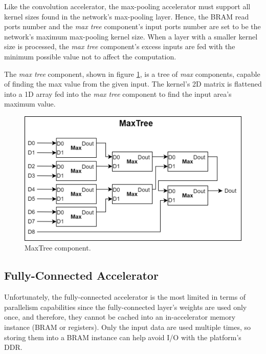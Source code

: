 Like the convolution accelerator, the max-pooling accelerator must support all kernel sizes found in the network's max-pooling layer. Hence, the BRAM read ports number and the \emph{max tree} component's input ports number are set to be the network's maximum max-pooling kernel size. When a layer with a smaller kernel size is processed, the \emph{max tree} component's excess inputs are fed with the minimum possible value not to affect the computation.

The \emph{max tree} component, shown in figure \ref{fig:max-tree-component}, is a tree of \emph{max} components, capable of finding the max value from the given input. The kernel's 2D matrix is flattened into a 1D array fed into the \emph{max tree} component to find the input area's maximum value.

\begin{figure} [H]
	\centering
	\includegraphics[width=\textwidth]{Images/Platform/MaxTree_component.png}
	\decoRule
	\caption[MaxTree component]{MaxTree component.}
	\label{fig:max-tree-component}
\end{figure}

\subsection{Fully-Connected Accelerator}
Unfortunately, the fully-connected accelerator is the most limited in terms of parallelism capabilities since the fully-connected layer's weights are used only once, and therefore, they cannot be cached into an in-accelerator memory instance (BRAM or registers). Only the input data are used multiple times, so storing them into a BRAM instance can help avoid I/O with the platform's DDR.

